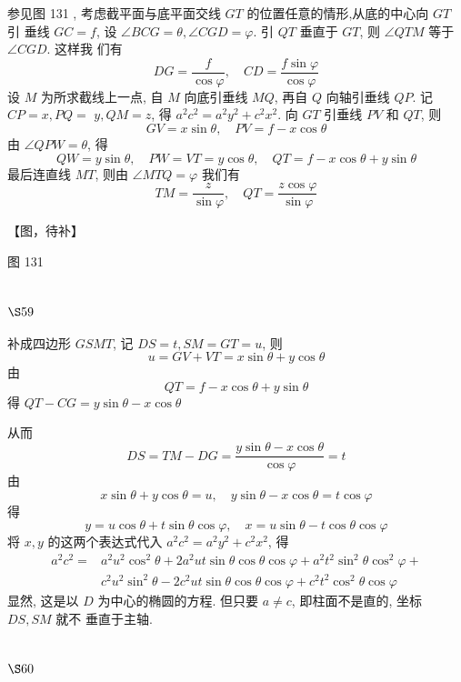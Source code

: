 参见图 131 , 考虑截平面与底平面交线 $G T$ 的位置任意的情形,从底的中心向 $G T$ 引 垂线 $G C=f$, 设 $\angle B C G=\theta, \angle C G D=\varphi$. 引 $Q T$ 垂直于 $G T$, 则 $\angle Q T M$ 等于 $\angle C G D$. 这样我 们有
\[
D G=\frac{f}{\cos \varphi}, \quad C D=\frac{f \sin \varphi}{\cos \varphi}
\]
设 $M$ 为所求截线上一点, 自 $M$ 向底引垂线 $M Q$, 再自 $Q$ 向轴引垂线 $Q P$. 记 $C P=x, P Q=$ $y, Q M=z$, 得 $a^{2} c^{2}=a^{2} y^{2}+c^{2} x^{2}$. 向 $G T$ 引垂线 $P V$ 和 $Q T$, 则
\[
G V=x \sin \theta, \quad P V=f-x \cos \theta
\]
由 $\angle Q P W=\theta$, 得
\[
Q W=y \sin \theta, \quad P W=V T=y \cos \theta, \quad Q T=f-x \cos \theta+y \sin \theta
\]
最后连直线 $M T$, 则由 $\angle M T Q=\varphi$ 我们有
\[
T M=\frac{z}{\sin \varphi}, \quad Q T=\frac{z \cos \varphi}{\sin \varphi}
\]

【图，待补】

图 131

\section{$\S 59$}

补成四边形 $G S M T$, 记 $D S=t, S M=G T=u$, 则
\[
u=G V+V T=x \sin \theta+y \cos \theta
\]
由
\[
Q T=f-x \cos \theta+y \sin \theta
\]
得 
 $Q T-C G=y \sin \theta-x \cos \theta$

从而
\[
D S=T M-D G=\frac{y \sin \theta-x \cos \theta}{\cos \varphi}=t
\]
由
\[
x \sin \theta+y \cos \theta=u, \quad y \sin \theta-x \cos \theta=t \cos \varphi
\]
得
\[
y=u \cos \theta+t \sin \theta \cos \varphi, \quad x=u \sin \theta-t \cos \theta \cos \varphi
\]
将 $x, y$ 的这两个表达式代入 $a^{2} c^{2}=a^{2} y^{2}+c^{2} x^{2}$, 得
\[
\begin{aligned}
a^{2} c^{2}= & a^{2} u^{2} \cos ^{2} \theta+2 a^{2} u t \sin \theta \cos \theta \cos \varphi+a^{2} t^{2} \sin ^{2} \theta \cos ^{2} \varphi+ \\
& c^{2} u^{2} \sin ^{2} \theta-2 c^{2} u t \sin \theta \cos \theta \cos \varphi+c^{2} t^{2} \cos ^{2} \theta \cos \varphi
\end{aligned}
\]
显然, 这是以 $D$ 为中心的椭圆的方程. 但只要 $a \neq c$, 即柱面不是直的, 坐标 $D S, S M$ 就不 垂直于主轴.

\section{$\S 60$}

